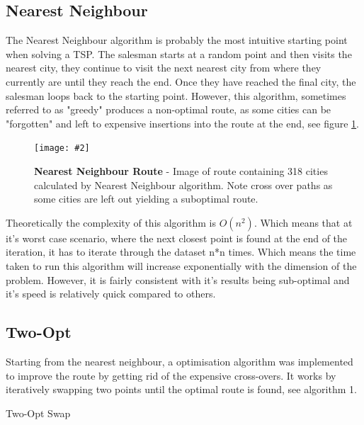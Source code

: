 \documentclass[10pt, a4paper]{article}
\newcommand{\figuremacro}[5]{
    \begin{figure}[#1]
        \centering
        \texttt{[image: \#2]}
        \caption[#3]{\textbf{#3}#4}
        \label{fig:#2}
    \end{figure}
}
\begin{document}
	\subsection{Nearest Neighbour}
	The Nearest Neighbour algorithm is probably the most intuitive starting point when solving a TSP. The salesman starts at a random point and then visits the nearest city, they continue to visit the next nearest city from where they currently are until they reach the end. Once they have reached the final city, the salesman loops back to the starting point. However, this algorithm, sometimes referred to as "greedy" produces a non-optimal route, as some cities can be "forgotten" and left to expensive insertions into the route at the end, see figure \ref{fig:nnroutepath}.
	\figuremacro{h}{nnroutepath}{Nearest Neighbour Route}{ - Image of route containing 318 cities calculated by Nearest Neighbour algorithm. Note cross over paths as some cities are left out yielding a suboptimal route.}{1.0}
	
	Theoretically the complexity of this algorithm is $O(n^2)$. Which means that at it's worst case scenario, where the next closest point is found at the end of the iteration, it has to iterate through the dataset n*n times. Which means the time taken to run this algorithm will increase exponentially with the dimension of the problem. However, it is fairly consistent with it's results being sub-optimal and it's speed is relatively quick compared to others. \cite{nearest}
	
	\subsection{Two-Opt}
	Starting from the nearest neighbour, a optimisation algorithm was implemented to improve the route by getting rid of the expensive cross-overs. It works by iteratively swapping two points until the optimal route is found, see algorithm 1.
	
	\begin{algorithm}[h]
		\caption{Two-Opt Swap}
	\end{algorithm}
	
\end{document}
